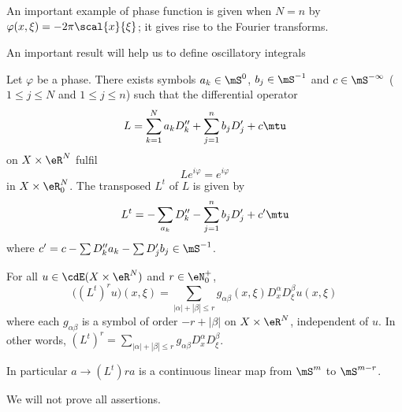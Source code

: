 An important example of phase function is given when $N=n$ by $\varphi (x,\xi)=-2\pi \scal{x}{\xi}$; it gives rise to the Fourier transforms.

An important result will help us to define oscillatory integrals

\begin{lemma}  \label{lem:defL}
	Let $\varphi$ be a phase. There exists symbols $a_k\in \mS^0$, $b_j\in\mS^{-1}$ and $c\in\mS^{-\infty}$ ($1\leq j\leq N$ and $1\leq j\leq n$) such that the differential operator
	\[
		L=\sum_{k=1}^Na_kD''_k+\sum_{j=1}^nb_jD'_j+c\mtu
	\]
	on $X\times\eR^N$ fulfil
	\[
		Le^{i\varphi}=e^{i\varphi}
	\]
	in $X\times\eR^N_0$. The transposed $L^t$ of $L$ is given by
	\[
		L^t=-\sum_{a_k}D''_k-\sum_{j=1}^nb_jD'_j+c'\mtu
	\]
	where $c'=c-\sum D''_ka_k-\sum D'_jb_j\in\mS^{-1}$.

	For all $u\in\cdE(X\times\eR^N)$ and $r\in\eN^+_0$,
	\[
		\big( (L^t)^ru \big)(x,\xi)=\sum_{| \alpha |+| \beta |\leq r}g_{\alpha\beta}(x,\xi)D_x^{\alpha}D_{\xi}^{\beta} u (x,\xi)
	\]
	where each $g_{\alpha\beta}$ is a symbol of order $-r+| \beta |$ on $X\times\eR^N$, independent of $u$. In other words,
	$(L^t)^r= \sum_{| \alpha |+| \beta |\leq r}g_{\alpha\beta}D_x^{\alpha}D_{\xi}^{\beta}$.

	In particular $a\to (L^t)ra$ is a continuous linear map from $\mS^m$ to $\mS^{m-r}$.

\end{lemma}

We will not prove all assertions.

